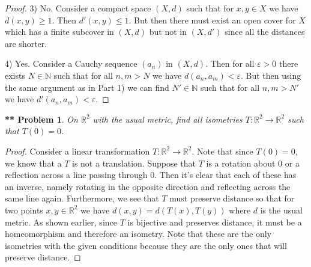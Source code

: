 \documentclass{article}
\newtheorem{**}{** Problem}
\begin{document}
\begin{flushleft}
\begin{proof}
3) No. Consider a compact space $(X, d)$ such that for $x,y \in X$ we have $d(x,y) \geq 1$. Then $d'(x,y) \leq 1$. But then there must exist an open cover for $X$ which has a finite subcover in $(X, d)$ but not in $(X, d')$ since all the distances are shorter.\newline

4) Yes. Consider a Cauchy sequence $(a_n)$ in $(X, d)$. Then for all $\varepsilon > 0$ there exists $N \in \mathbb{N}$ such that for all $n, m > N$ we have $d(a_n, a_m) < \varepsilon$. But then using the same argument as in Part 1) we can find $N' \in \mathbb{N}$ such that for all $n, m > N'$ we have $d'(a_n, a_m) < \varepsilon$.
\end{proof}

\begin{**}
On $\mathbb{R}^2$ with the usual metric, find all isometries $T : \mathbb{R}^2 \rightarrow \mathbb{R}^2$ such that $T(0) = 0$.
\end{**}
\begin{proof}
Consider a linear transformation $T : \mathbb{R}^2 \rightarrow \mathbb{R}^2$. Note that since $T(0) = 0$, we know that a $T$ is not a translation. Suppose that $T$ is a rotation about $0$ or a reflection across a line passing through $0$. Then it's clear that each of these has an inverse, namely rotating in the opposite direction and reflecting across the same line again. Furthermore, we see that $T$ must preserve distance so that for two points $x, y \in \mathbb{R}^2$ we have $d(x, y) = d(T(x), T(y))$ where $d$ is the usual metric. As shown earlier, since $T$ is bijective and preserves distance, it must be a homeomorphism and therefore an isometry. Note that these are the only isometries with the given conditions because they are the only ones that will preserve distance.
\end{proof}


\end{flushleft}
\end{document}
